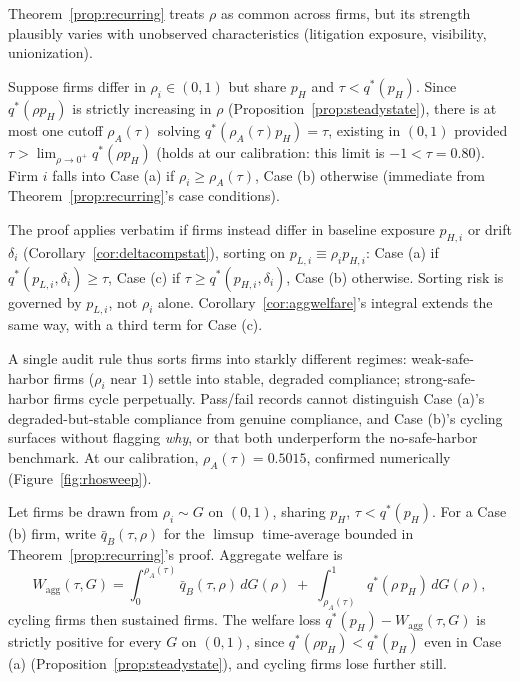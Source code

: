 Theorem~\ref{prop:recurring} treats $\rho$ as common across firms, but its strength plausibly varies with unobserved characteristics (litigation exposure, visibility, unionization).

\begin{proposition}
Suppose firms differ in $\rho_i \in (0,1)$ but share $p_H$ and $\tau < q^*(p_H)$. Since $q^*(\rho p_H)$ is strictly increasing in $\rho$ (Proposition~\ref{prop:steadystate}), there is at most one cutoff $\rho_A(\tau)$ solving $q^*(\rho_A(\tau) p_H) = \tau$, existing in $(0,1)$ provided $\tau > \lim_{\rho\to0^+}q^*(\rho p_H)$ (holds at our calibration: this limit is $-1<\tau=0.80$). Firm $i$ falls into Case (a) if $\rho_i \geq \rho_A(\tau)$, Case (b) otherwise (immediate from Theorem~\ref{prop:recurring}'s case conditions).
\label{prop:heterogeneous}
\end{proposition}

\begin{remark}
\label{rem:heterogeneous-general}
The proof applies verbatim if firms instead differ in baseline exposure $p_{H,i}$ or drift $\delta_i$ (Corollary~\ref{cor:deltacompstat}), sorting on $p_{L,i}\equiv\rho_i p_{H,i}$: Case (a) if $q^*(p_{L,i},\delta_i)\geq\tau$, Case (c) if $\tau\geq q^*(p_{H,i},\delta_i)$, Case (b) otherwise. Sorting risk is governed by $p_{L,i}$, not $\rho_i$ alone. Corollary~\ref{cor:aggwelfare}'s integral extends the same way, with a third term for Case (c).
\end{remark}

A single audit rule thus sorts firms into starkly different regimes: weak-safe-harbor firms ($\rho_i$ near $1$) settle into stable, degraded compliance; strong-safe-harbor firms cycle perpetually. Pass/fail records cannot distinguish Case (a)'s degraded-but-stable compliance from genuine compliance, and Case (b)'s cycling surfaces without flagging \emph{why}, or that both underperform the no-safe-harbor benchmark. At our calibration, $\rho_A(\tau)=0.5015$, confirmed numerically (Figure~\ref{fig:rhosweep}).

\begin{corollary}
\label{cor:aggwelfare}
Let firms be drawn from $\rho_i\sim G$ on $(0,1)$, sharing $p_H$, $\tau<q^*(p_H)$. For a Case (b) firm, write $\bar q_B(\tau,\rho)$ for the $\limsup$ time-average bounded in Theorem~\ref{prop:recurring}'s proof. Aggregate welfare is
\begin{equation}
W_{\mathrm{agg}}(\tau, G) = \int_0^{\rho_A(\tau)} \bar{q}_B(\tau,\rho)\, dG(\rho) \;+\; \int_{\rho_A(\tau)}^{1} q^*(\rho\, p_H)\, dG(\rho),
\label{eq:aggwelfare}
\end{equation}
cycling firms then sustained firms. The welfare loss $q^*(p_H) - W_{\mathrm{agg}}(\tau, G)$ is strictly positive for every $G$ on $(0,1)$, since $q^*(\rho p_H) < q^*(p_H)$ even in Case (a) (Proposition~\ref{prop:steadystate}), and cycling firms lose further still.
\end{corollary}

